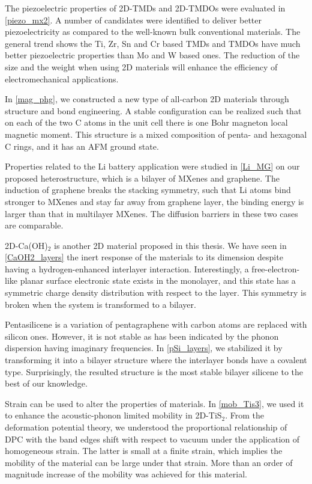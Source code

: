 The piezoelectric properties of 2D-TMDs and 2D-TMDOs were evaluated in \autoref{piezo_mx2}. A number of candidates were identified to deliver better piezoelectricity as compared to the well-known bulk conventional materials. The general trend shows the Ti,  Zr, Sn and Cr based TMDs and TMDOs have much better piezoelectric properties than Mo and W based ones. The reduction of the size and the weight when using 2D materials will enhance the efficiency of electromechanical applications.

In \autoref{mag_phg}, we constructed a new type of all-carbon 2D materials through structure and bond engineering. A stable configuration can be realized such that on each of the two C atoms in the unit cell there is one Bohr magneton local magnetic moment. This structure is a mixed composition of penta- and hexagonal C rings, and it has an AFM ground state.

Properties related to the Li battery application were studied in \autoref{Li_MG} on our proposed heterostructure, which is a bilayer of MXenes and graphene. The induction of graphene breaks the stacking symmetry, such that Li atoms bind stronger to MXenes and stay far away from graphene layer, the binding energy is larger than that in multilayer MXenes. The diffusion barriers in these two cases are comparable. 

2D-Ca(OH)$_2$ is another 2D material proposed in this thesis. We have seen in \autoref{CaOH2_layers} the inert response of the materials to its dimension despite having a hydrogen-enhanced interlayer interaction. Interestingly, a free-electron-like planar surface electronic state exists in the monolayer, and this state has a symmetric charge density distribution with respect to the layer. This symmetry is broken when the system is transformed to a bilayer.

Pentasilicene is a variation of pentagraphene with carbon atoms are replaced with silicon ones. However, it is not stable as has been indicated by the phonon dispersion having imaginary frequencies. In \autoref{pSi_layers}, we stabilized it by transforming it into a bilayer structure where the interlayer bonds have a covalent type. Surprisingly, the resulted structure is the most stable bilayer silicene to the best of our knowledge.

Strain can be used to alter the properties of materials. In \autoref{mob_Tis3}, we used it to enhance the acoustic-phonon limited mobility in 2D-TiS$_2$. From the deformation potential theory, we understood the proportional relationship of DPC with the band edges shift with respect to vacuum under the application of homogeneous strain. The latter is small at a finite strain, which implies the mobility of the material can be large under that strain. More than an order of magnitude increase of the mobility was achieved for this material.

